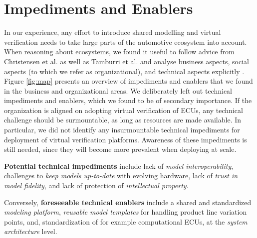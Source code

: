 \section{Impediments and Enablers}\label{sec:impediments_and_enablers}
In our experience, any effort to introduce shared modelling and virtual verification needs to take large parts of the automotive ecosystem into account. 
When reasoning about ecosystems, we found it useful to follow advice from Christensen et al. as well as Tamburri et al. and analyse business aspects, social aspects (to which we refer as organizational), and technical aspects explicitly \cite{christensen2014analysis,tamburri2013uncovering}. 
Figure \ref{fig:map}  presents an overview of impediments and enablers that we found in the business and organizational areas.
We deliberately left out technical impediments and enablers, which we found to be of secondary importance. %
If the organization is aligned on adopting virtual verification of ECUs,
any technical challenge should be surmountable, as long as resources are made available.
In particular, we did not identify any insurmountable technical impediments for deployment of virtual verification platforms.
Awareness of these impediments is still needed, since they will become more prevalent when deploying at scale.

\textbf{Potential technical impediments} include
lack of \emph{model interoperability},
challenges to \emph{keep models up-to-date} with evolving hardware,
lack of \emph{trust in model fidelity},
and lack of protection of \emph{intellectual property}.

Conversely, \textbf{foreseeable technical enablers} include a shared and standardized \emph{modeling platform},
\emph{reusable model templates} for handling product line variation points,
and, standardization of for example computational ECUs, at the \emph{system architecture} level.




